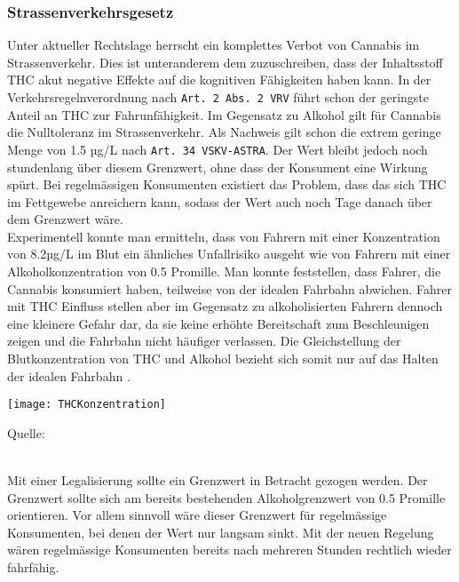 \documentclass[../main.tex]{subfiles}
\begin{document}
	 	 
	 \subsubsection{Strassenverkehrsgesetz}
	 Unter aktueller Rechtslage herrscht ein komplettes Verbot von Cannabis im Strassenverkehr. 
	 Dies ist unteranderem dem zuzuschreiben, dass der Inhaltsstoff THC akut negative Effekte auf die kognitiven Fähigkeiten haben kann.	 
	 In der Verkehrsregelnverordnung nach \texttt{Art. 2 Abs. 2 VRV} führt schon der geringste Anteil an THC zur Fahrunfähigkeit.
	 Im Gegensatz zu Alkohol gilt für Cannabis die Nulltoleranz im Strassenverkehr.
	 Als Nachweis gilt schon die extrem geringe Menge von 1.5 µg/L nach \texttt{Art. 34 VSKV-ASTRA}.
	 Der Wert bleibt jedoch noch stundenlang über diesem Grenzwert, ohne dass der Konsument eine Wirkung spürt.
	 Bei regelmässigen Konsumenten existiert das Problem, dass das sich THC im Fettgewebe anreichern kann, sodass der Wert auch noch Tage danach über dem Grenzwert wäre. \\
	 
	 \noindent	 
	 Experimentell konnte man ermitteln, dass von Fahrern mit einer Konzentration von 8.2µg/L im Blut ein ähnliches Unfallrisiko ausgeht wie von Fahrern mit einer Alkoholkonzentration von 0.5 Promille.
	 Man konnte feststellen, dass Fahrer, die Cannabis konsumiert haben, teilweise von der idealen Fahrbahn abwichen.
	 Fahrer mit THC Einfluss stellen aber im Gegensatz zu alkoholisierten Fahrern dennoch eine kleinere Gefahr dar, da sie keine erhöhte Bereitschaft zum Beschleunigen zeigen und die Fahrbahn nicht häufiger verlassen.
	 Die Gleichstellung der Blutkonzentration von THC und Alkohol bezieht sich somit nur auf das Halten der idealen Fahrbahn \cite{hartman-2015}.\\
	 
	 \noindent
	 {
		\centering
		\texttt{[image: THCKonzentration]}
		\captionsetup{font=small}
		\small 
		\noindent
		\begin{center}
		Quelle: \cite{giroud}
		\end{center}
	 }	
	 
	 \noindent \\
	 Mit einer Legalisierung sollte ein Grenzwert in Betracht gezogen werden.
	 Der Grenzwert sollte sich am bereits bestehenden Alkoholgrenzwert von 0.5 Promille orientieren. 
	 Vor allem sinnvoll wäre dieser Grenzwert für regelmässige Konsumenten, bei denen der Wert nur langsam sinkt.
	 Mit der neuen Regelung wären regelmässige Konsumenten bereits nach mehreren Stunden rechtlich wieder fahrfähig.
	 
\end{document}
